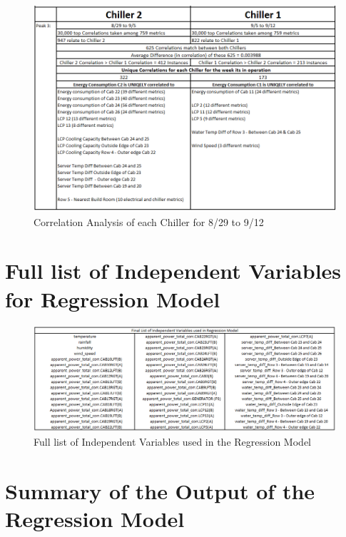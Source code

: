 \documentclass[12pt]{scrartcl}
\begin{document}
\begin{figure}[H]
  \caption{Correlation Analysis of each Chiller for 8/29 to 9/12}
  \label{fig:peak2chillercorrelation}
  \centering
    \includegraphics[scale=0.50]{peak3chillercorrelation}
\end{figure}


\section{Full list of Independent Variables for Regression Model}
\label{sec:[Full list of Independent Variables for Regression Model]}

\begin{figure}[H]
  \caption{Full list of Independent Variables used in the Regression Model}
  \label{fig:independentvariables}
  \centering
    \includegraphics[scale=0.50]{independentvariables}
\end{figure} 

\section{Summary of the Output of the Regression Model}
\label{sec:[Summary of the Output of the Regression Model]}
\end{document}
